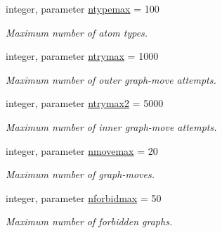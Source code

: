 \begin{DoxyCompactItemize}
\mbox{\label{namespaceconstants_a24e30cb7e0461e17265ad6b609c26bdc}} 
integer, parameter \mbox{\hyperlink{namespaceconstants_a24e30cb7e0461e17265ad6b609c26bdc}{ntypemax}} = 100
\begin{DoxyCompactList}\small\item\em Maximum number of atom types. \end{DoxyCompactList}\item 
\mbox{\label{namespaceconstants_a0c348f25e628c1da408c4f2c27ece033}} 
integer, parameter \mbox{\hyperlink{namespaceconstants_a0c348f25e628c1da408c4f2c27ece033}{ntrymax}} = 1000
\begin{DoxyCompactList}\small\item\em Maximum number of outer graph-\/move attempts. \end{DoxyCompactList}\item 
\mbox{\label{namespaceconstants_abc87d2d1cf985c3913b37229f4520626}} 
integer, parameter \mbox{\hyperlink{namespaceconstants_abc87d2d1cf985c3913b37229f4520626}{ntrymax2}} = 5000
\begin{DoxyCompactList}\small\item\em Maximum number of inner graph-\/move attempts. \end{DoxyCompactList}\item 
\mbox{\label{namespaceconstants_ac598462b6c881cc88f22cb8d17e40e72}} 
integer, parameter \mbox{\hyperlink{namespaceconstants_ac598462b6c881cc88f22cb8d17e40e72}{nmovemax}} = 20
\begin{DoxyCompactList}\small\item\em Maximum number of graph-\/moves. \end{DoxyCompactList}\item 
\mbox{\label{namespaceconstants_a69a27ee183e06204f45facc8ef7fe756}} 
integer, parameter \mbox{\hyperlink{namespaceconstants_a69a27ee183e06204f45facc8ef7fe756}{nforbidmax}} = 50
\begin{DoxyCompactList}\small\item\em Maximum number of forbidden graphs. \end{DoxyCompactList}\item 
\mbox{\label{namespaceconstants_ac336c2441f463ecd76d2c05ffe55420e}} 

\end{DoxyCompactItemize}

